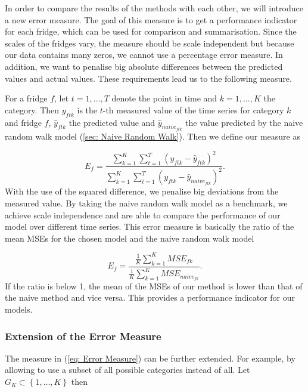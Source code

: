 In order to compare the results of the methods with each other, we will introduce a new error measure. The goal of this measure is to get a performance indicator for each fridge, which can be used for comparison and summarisation. Since the scales of the fridges vary, the measure should be scale independent but because our data contains many zeros, we cannot use a percentage error measure. In addition, we want to penalise big absolute differences between the predicted values and actual values. These requirements lead us to the following measure.

For a fridge $f$, let $t = 1,\ldots,T$ denote the point in time and $k=1,\ldots,K$ the category. Then $y_{ftk}$ is the $t$-th measured value of the time series for category $k$ and fridge $f$, $\hat{y}_{ftk}$ the predicted value and $\hat{y}_{naive_{ftk}}$ the value predicted by the naive random walk model (\ref{sec: Naive Random Walk}). Then we define our measure as

\begin{equation}
E_f=\frac{\sum_{k=1}^{K}\sum_{t=1}^T(y_{ftk}-\hat{y}_{ftk})^2}{\sum_{k=1}^{K}\sum_{t=1}^T(y_{ftk}-\hat{y}_{naive_{ftk}})^2}.
\label{eq: Error Measure}
\end{equation}
%
With the use of the squared difference, we penalise big deviations from the measured value. By taking the naive random walk model as a benchmark, we achieve scale independence and are able to compare the performance of our model over different time series. This error measure is basically the ratio of the mean MSEs for the chosen model and the naive random walk model

\begin{equation}
E_f=\frac{\frac{1}{K}\sum_{k=1}^K MSE_{fk}}{\frac{1}{K}\sum_{k=1}^K MSE_{naive_{fk}}}.
\label{eq: Error Measure MSE}
\end{equation}
%
If the ratio is below 1, the mean of the MSEs of our method is lower than that of the naive method and vice versa. This provides a performance indicator for our models. 

\subsubsection{Extension of the Error Measure}
\label{sec:Error Measure Extension}

The measure in (\ref{eq: Error Measure}) can be further extended. For example, by allowing to use a subset of all possible categories instead of all. Let $G_K \subset \left\{1,\ldots,K\right\}$ then

